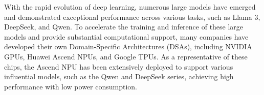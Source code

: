 





With the rapid evolution of deep learning, numerous large models have emerged and demonstrated exceptional performance across various tasks, such as Llama 3, DeepSeek, and Qwen.
To accelerate the training and inference of these large models and provide substantial computational support, many companies have developed their own Domain-Specific Architectures (DSAs), including NVIDIA GPUs, Huawei Ascend NPUs, and Google TPUs.
As a representative of these chips, the Ascend NPU has been extensively deployed to support various influential models, such as the Qwen and DeepSeek series, achieving high performance with low power consumption.

